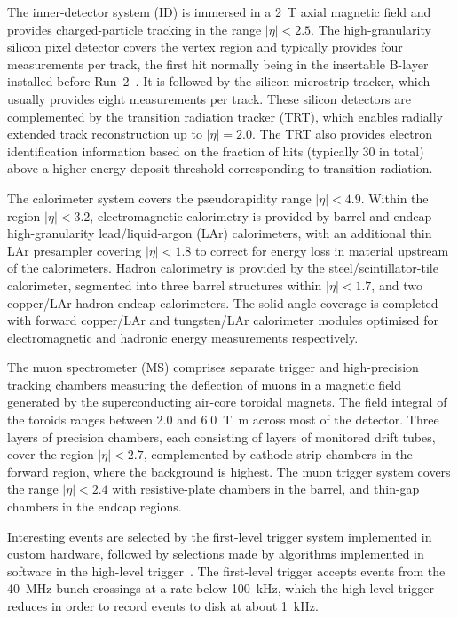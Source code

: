 \documentclass[cernpreprint, atlasdraft=false, texlive=2023, UKenglish, texmf, orcidlogo]{atlasdoc}
\begin{document}
The inner-detector system (ID) is immersed in a \qty{2}{\tesla} axial magnetic field
and provides charged-particle tracking in the range \(|\eta| < 2.5\).
The high-granularity silicon pixel detector covers the vertex region and typically provides four measurements per track,
the first hit normally being in the insertable B-layer installed before Run~2~\cite{ATLAS-TDR-19,PIX-2018-001}.
It is followed by the silicon microstrip tracker, which usually provides eight measurements per track.
These silicon detectors are complemented by the transition radiation tracker (TRT),
which enables radially extended track reconstruction up to \(|\eta| = 2.0\).
The TRT also provides electron identification information
based on the fraction of hits (typically 30 in total) above a higher energy-deposit threshold corresponding to transition radiation.
 
The calorimeter system covers the pseudorapidity range \(|\eta| < 4.9\).
Within the region \(|\eta|< 3.2\), electromagnetic calorimetry is provided by barrel and
endcap high-granularity lead/liquid-argon (LAr) calorimeters,
with an additional thin LAr presampler covering \(|\eta| < 1.8\)
to correct for energy loss in material upstream of the calorimeters.
Hadron calorimetry is provided by the steel/scintillator-tile calorimeter,
segmented into three barrel structures within \(|\eta| < 1.7\), and two copper/LAr hadron endcap calorimeters.
The solid angle coverage is completed with forward copper/LAr and tungsten/LAr calorimeter modules
optimised for electromagnetic and hadronic energy measurements respectively.
 
The muon spectrometer (MS) comprises separate trigger and
high-precision tracking chambers measuring the deflection of muons in a magnetic field generated by the superconducting air-core toroidal magnets.
The field integral of the toroids ranges between \num{2.0} and \qty{6.0}{\tesla\metre}
across most of the detector.
Three layers of precision chambers, each consisting of layers of monitored drift tubes, cover the region \(|\eta| < 2.7\),
complemented by cathode-strip chambers in the forward region, where the background is highest.
The muon trigger system covers the range \(|\eta| < 2.4\) with resistive-plate chambers in the barrel, and thin-gap chambers in the endcap regions.
 
Interesting events are selected by the first-level trigger system implemented in custom hardware,
followed by selections made by algorithms implemented in software in the high-level trigger~\cite{TRIG-2016-01}.
The first-level trigger accepts events from the \qty{40}{\MHz} bunch crossings at a rate below \qty{100}{\kHz},
which the high-level trigger reduces in order to record events to disk at about \qty{1}{\kHz}.
 
\end{document}
